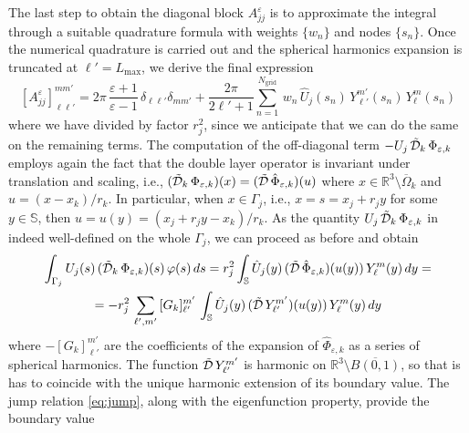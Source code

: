 The last step to obtain the diagonal block $A_{jj}^\varepsilon$ is to approximate the integral through a suitable quadrature formula with weights $\{w_n\}$ and nodes $\{ s_n\}$. Once the numerical quadrature is carried out and the spherical harmonics expansion is truncated at $\ell' = L_\text{max}$, we derive the final expression
\begin{equation}\label{eq:ajj}
[A_{jj}^\varepsilon]_{\ell \ell'}^{mm'} = 2\pi \, \frac{\varepsilon+1}{\varepsilon-1} \,  \delta_{\ell \ell'} \delta_{mm'} + \frac{2\pi}{2\ell'+1} \sum_{n=1}^{N_\text{grid}} \, w_n \, \hat{U}_j(s_n)  \, Y_{\ell'}^{m'}(s_n)\,  Y_\ell^m(s_n)
\end{equation}
where we have divided by factor $r_j^2$, since we anticipate that we can do the same on the remaining terms. The computation of the off-diagonal term $-U_j \, \tilde{\mathcal{D}}_k \, \Phi_{\varepsilon,k}$ employs again the fact that the double layer operator is invariant under translation and scaling, i.e., $(\tilde{\mathcal{D}}_k \, \Phi_{\varepsilon,k} )(x) = (\tilde{\mathcal{D}} \, \hat{\Phi}_{\varepsilon,k})(u)$ where $x \in \mathbb{R}^3 \setminus \overline{\Omega}_k$ and $u = (x -x_k)/ r_k$. In particular, when $x \in \Gamma_j$, i.e., $x = s = x_j + r_j y$ for some $y \in \mathbb{S}$, then $u = u(y) = (x_j + r_j y -x_k)/r_k$. As the quantity $U_j \, \tilde{\mathcal{D}}_k \, \Phi_{\varepsilon,k}$ in indeed well-defined on the whole $\Gamma_j$, we can proceed as before and obtain
\begin{multline*}
\int_{\Gamma_j}U_j(s) \, (\tilde{\cD}_k \, \Phi_{\varepsilon,k})(s) \, \varphi(s) \, ds
 = r_j^2  \int_{\mathbb{S}} \hat{U}_j(y) \, (\tilde{\cD} \, \hat{\Phi}_{\varepsilon,k})(u(y)) \, Y_{\ell}^{m}(y) \, dy = \\ %
= - r_j^2 \, \sum_{\ell',m'} \, [G_k]_{\ell'}^{m'} \,  \int_{\mathbb{S}} \hat{U}_j(y) \, (\tilde{\cD} \, Y_{\ell'}^{m'})(u(y)) \, Y_{\ell}^{m}(y) \, dy 
\end{multline*}
where $-[G_k]_{\ell'}^{m'}$ are the coefficients of the expansion of $ \hat{\Phi}_{\varepsilon,k}$ as a series of spherical harmonics. The function $\tilde{\mathcal{D}} \, Y_{\ell'}^{m'}$ is harmonic on $\mathbb{R}^3 \setminus \overline{B(0,1)}$, so that is has to coincide with the unique harmonic extension of its boundary value. The jump relation \eqref{eq:jump}, along with the eigenfunction property, provide the boundary value
